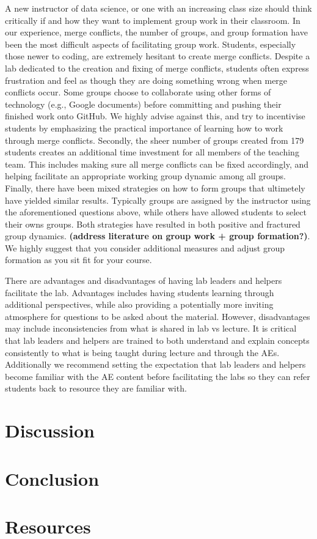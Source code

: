 \documentclass[
  12pt]{article}
\begin{document}
A new instructor of data science, or one with an increasing class size
should think critically if and how they want to implement group work in
their classroom. In our experience, merge conflicts, the number of
groups, and group formation have been the most difficult aspects of
facilitating group work. Students, especially those newer to coding, are
extremely hesitant to create merge conflicts. Despite a lab dedicated to
the creation and fixing of merge conflicts, students often express
frustration and feel as though they are doing something wrong when merge
conflicts occur. Some groups choose to collaborate using other forms of
technology (e.g., Google documents) before committing and pushing their
finished work onto GitHub. We highly advise against this, and try to
incentivise students by emphasizing the practical importance of learning
how to work through merge conflicts. Secondly, the sheer number of
groups created from 179 students creates an additional time investment
for all members of the teaching team. This includes making sure all
merge conflicts can be fixed accordingly, and helping facilitate an
appropriate working group dynamic among all groups. Finally, there have
been mixed strategies on how to form groups that ultimetely have yielded
similar results. Typically groups are assigned by the instructor using
the aforementioned questions above, while others have allowed students
to select their owns groups. Both strategies have resulted in both
positive and fractured group dynamics. \textbf{(address literature on
group work + group formation?)}. We highly suggest that you consider
additional measures and adjust group formation as you sit fit for your
course.

There are advantages and disadvantages of having lab leaders and helpers
facilitate the lab. Advantages includes having students learning through
additional perspectives, while also providing a potentially more
inviting atmosphere for questions to be asked about the material.
However, disadvantages may include inconsistencies from what is shared
in lab vs lecture. It is critical that lab leaders and helpers are
trained to both understand and explain concepts consistently to what is
being taught during lecture and through the AEs. Additionally we
recommend setting the expectation that lab leaders and helpers become
familiar with the AE content before facilitating the labs so they can
refer students back to resource they are familiar with.

\hypertarget{discussion}{%
\section{Discussion}\label{discussion}}

\hypertarget{conclusion}{%
\section{Conclusion}\label{conclusion}}

\hypertarget{resources}{%
\section{Resources}\label{resources}}

\newpage


\renewcommand\refname{References}
  
\end{document}

